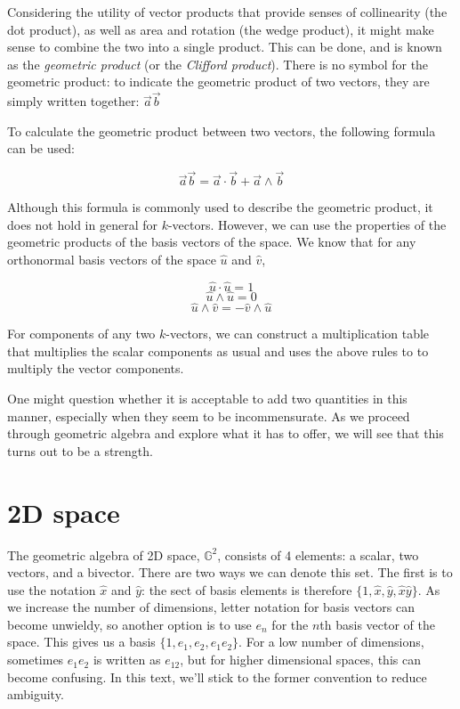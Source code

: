 Considering the utility of vector products that provide senses of collinearity (the dot product),
as well as area and rotation (the wedge product), it might make sense to combine the two into a 
single product. This can be done, and is known as the \textit{geometric product} (or the 
\textit{Clifford product}). There is no symbol for the geometric product: to indicate the geometric
product of two vectors, they are simply written together: $\vec{a}\vec{b}$

To calculate the geometric product between two vectors, the following formula can be used:

$$\vec{a}\vec{b} = \vec{a} \cdot \vec{b} + \vec{a} \wedge \vec{b}$$

Although this formula is commonly used to describe the geometric product, it does not hold in 
general for $k$-vectors. However, we can use the properties of the geometric products of the basis
vectors of the space. We know that for any orthonormal basis vectors of the space $\hat{u}$ and 
$\hat{v}$,

$$\hat{u} \cdot \hat{u} = 1$$
$$\hat{u} \wedge \hat{u} = 0$$
$$\hat{u} \wedge \hat{v} = -\hat{v} \wedge \hat{u}$$

For components of any two $k$-vectors, we can construct a multiplication table that multiplies the
scalar components as usual and uses the above rules to to multiply the vector components.

One might question whether it is acceptable to add two quantities in this manner, especially when
they seem to be incommensurate. As we proceed through geometric algebra and explore what it has to
offer, we will see that this turns out to be a strength.

\section{2D space}

The geometric algebra of 2D space, $\mathbb{G}^2$, consists of 4 elements: a scalar, two vectors,
and a bivector. There are two ways we can denote this set. The first is to use the notation
$\hat{x}$ and $\hat{y}$: the sect of basis elements is therefore $\{1, \hat{x}, \hat{y}, 
\hat{x}\hat{y}\}$. As we increase the number of dimensions, letter notation for basis vectors can
become unwieldy, so another option is to use $e_{n}$ for the $n$th basis vector of the space. 
This gives us a basis $\{1, e_1, e_2, e_{1}e_{2}\}$. For a low number of dimensions, sometimes
$e_{1}e_{2}$ is written as $e_{12}$, but for higher dimensional spaces, this can become confusing.
In this text, we'll stick to the former convention to reduce ambiguity.

